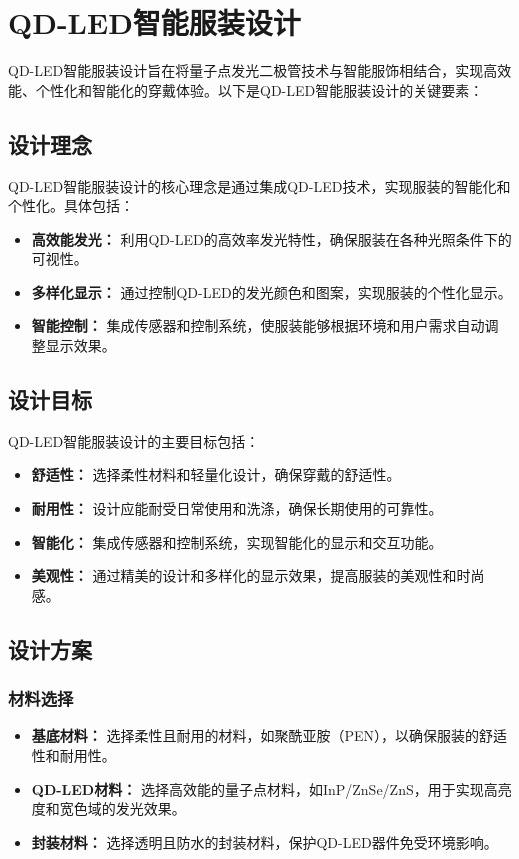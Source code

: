 \documentclass[12pt,hyperref,a4paper,UTF8]{ctexart}
\begin{document}
\section{QD-LED智能服装设计}

QD-LED智能服装设计旨在将量子点发光二极管技术与智能服饰相结合，实现高效能、个性化和智能化的穿戴体验。以下是QD-LED智能服装设计的关键要素：

\subsection{设计理念}
QD-LED智能服装设计的核心理念是通过集成QD-LED技术，实现服装的智能化和个性化。具体包括：
\begin{itemize}
  \item \textbf{高效能发光：} 利用QD-LED的高效率发光特性，确保服装在各种光照条件下的可视性。
  \item \textbf{多样化显示：} 通过控制QD-LED的发光颜色和图案，实现服装的个性化显示。
  \item \textbf{智能控制：} 集成传感器和控制系统，使服装能够根据环境和用户需求自动调整显示效果。
\end{itemize}

\subsection{设计目标}
QD-LED智能服装设计的主要目标包括：
\begin{itemize}
  \item \textbf{舒适性：} 选择柔性材料和轻量化设计，确保穿戴的舒适性。
  \item \textbf{耐用性：} 设计应能耐受日常使用和洗涤，确保长期使用的可靠性。
  \item \textbf{智能化：} 集成传感器和控制系统，实现智能化的显示和交互功能。
  \item \textbf{美观性：} 通过精美的设计和多样化的显示效果，提高服装的美观性和时尚感。
\end{itemize}

\subsection{设计方案}
\subsubsection*{材料选择}
\begin{itemize}
  \item \textbf{基底材料：} 选择柔性且耐用的材料，如聚酰亚胺（PEN），以确保服装的舒适性和耐用性。
  \item \textbf{QD-LED材料：} 选择高效能的量子点材料，如InP/ZnSe/ZnS，用于实现高亮度和宽色域的发光效果。
  \item \textbf{封装材料：} 选择透明且防水的封装材料，保护QD-LED器件免受环境影响。
\end{itemize}
\end{document}
